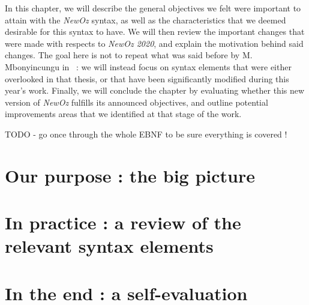 
In this chapter, we will describe the general objectives we felt were important to attain with the \textit{NewOz} syntax, as well as the characteristics that we deemed desirable for this syntax to have.
We will then review the important changes that were made  with respects to \textit{NewOz 2020}, and explain the motivation behind said changes.
The goal here is not to repeat what was said before by M. Mbonyincungu in~\cite{jpthesis} : we will instead focus on syntax elements that were either overlooked in that thesis, or that have been significantly modified during this year's work.
Finally, we will conclude the chapter by evaluating whether this new version of \textit{NewOz} fulfills its announced objectives, and outline potential improvements areas that we identified at that stage of the work.\newline

TODO - go once through the whole EBNF to be sure everything is covered !

\section{Our purpose : the big picture}\label{sec:ch2-goal}

\section{In practice : a review of the relevant syntax elements}\label{sec:ch2-review}

\section{In the end : a self-evaluation}\label{sec:ch2-evaluation}
